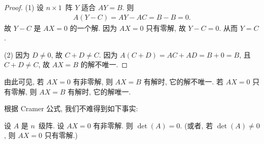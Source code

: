 \documentclass[../libro.tex]{subfiles}
\begin{document}
\begin{proof}
    (1)
    设 \(n \times 1\)~阵 \(Y\) 适合 \(AY = B\).
    则
    \begin{align*}
        A(Y - C) = AY - AC = B - B = 0.
    \end{align*}
    故 \(Y - C\) 是 \(AX = 0\) 的一个解.
    因为 \(AX = 0\) 只有零解,
    故 \(Y - C = 0\).
    从而 \(Y = C\).




    (2)
    因为 \(D \neq 0\), 故 \(C + D \neq C\).
    因为 \(A(C + D) = AC + AD = B + 0 = B\),
    且 \(C + D \neq C\),
    故 \(AX = B\) 的解不唯一.
\end{proof}

由此可见, 若 \(AX = 0\) 有非零解,
则 \(AX = B\) 有解时,
它的解不唯一.
若 \(AX = 0\) 只有零解,
则 \(AX = B\) 有解时,
它的解唯一.

根据 Cramer 公式, 我们不难得到如下事实:

\begin{theorem}
    设 \(A\) 是 \(n\)~级阵.
    设 \(AX = 0\) 有非零解.
    则 \(\det {(A)} = 0\).
    (或者, %
    若 \(\det {(A)} \neq 0\),
    则 \(AX = 0\) 只有零解.) %
\end{theorem}
\end{document}
